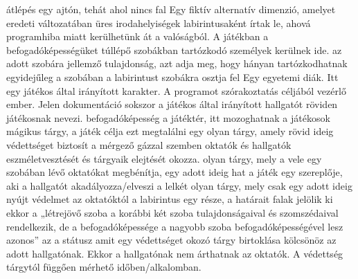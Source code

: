 \begin{szotar}
 {átlépés egy ajtón, tehát ahol nincs fal}
 {Egy fiktív alternatív dimenzió, amelyet eredeti változatában üres irodahelyiségek labirintusaként írtak le, ahová programhiba miatt kerülhetünk át a valóságból. A játékban a befogadóképességüket túllépő szobákban tartózkodó személyek kerülnek ide.}
 {az adott szobára jellemző tulajdonság, azt adja meg, hogy hányan tartózkodhatnak egyidejűleg a szobában}
 {a labirintust szobákra osztja fel}
 {Egy egyetemi diák. Itt egy játékos által irányított karakter.}
 {A programot szórakoztatás céljából vezérlő ember. Jelen dokumentáció sokszor a játékos által irányított hallgatót röviden játékosnak nevezi.}
 {befogadóképesség}
 {a játéktér, itt mozoghatnak a játékosok}
 {mágikus tárgy, a játék célja ezt megtalálni}
 {egy olyan tárgy, amely rövid ideig védettséget biztosít a mérgező gázzal szemben}
 {oktatók és hallgatók eszméletvesztését és tárgyaik elejtését okozza.}
 {olyan tárgy, mely a vele egy szobában lévő oktatókat megbénítja, egy adott ideig hat}
 {a játék egy szereplője, aki a hallgatót akadályozza/elveszi a lelkét}
 {olyan tárgy, mely csak egy adott ideig nyújt védelmet az oktatóktól}
 {a labirintus egy része, a határait falak jelölik ki}
 {ekkor a „létrejövő szoba a korábbi két szoba tulajdonságaival és szomszédaival rendelkezik, de a befogadóképessége a nagyobb szoba befogadóképességével lesz azonos”}
 {az a státusz amit egy védettséget okozó tárgy birtoklása kölcsönöz az adott hallgatónak. Ekkor a hallgatónak nem árthatnak az oktatók. A védettség tárgytól függően mérhető időben/alkalomban.}
\end{szotar}

